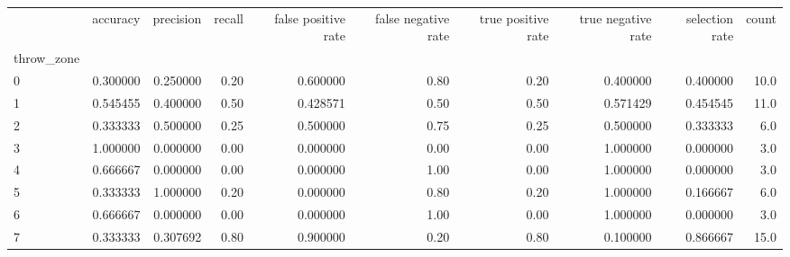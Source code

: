 \begin{tabular}{lrrrrrrrrr}
\toprule
{} &  accuracy &  precision &  recall &  false positive rate &  false negative rate &  true positive rate &  true negative rate &  selection rate &  count \\
throw\_zone &           &            &         &                      &                      &                     &                     &                 &        \\
\midrule
0          &  0.300000 &   0.250000 &    0.20 &             0.600000 &                 0.80 &                0.20 &            0.400000 &        0.400000 &   10.0 \\
1          &  0.545455 &   0.400000 &    0.50 &             0.428571 &                 0.50 &                0.50 &            0.571429 &        0.454545 &   11.0 \\
2          &  0.333333 &   0.500000 &    0.25 &             0.500000 &                 0.75 &                0.25 &            0.500000 &        0.333333 &    6.0 \\
3          &  1.000000 &   0.000000 &    0.00 &             0.000000 &                 0.00 &                0.00 &            1.000000 &        0.000000 &    3.0 \\
4          &  0.666667 &   0.000000 &    0.00 &             0.000000 &                 1.00 &                0.00 &            1.000000 &        0.000000 &    3.0 \\
5          &  0.333333 &   1.000000 &    0.20 &             0.000000 &                 0.80 &                0.20 &            1.000000 &        0.166667 &    6.0 \\
6          &  0.666667 &   0.000000 &    0.00 &             0.000000 &                 1.00 &                0.00 &            1.000000 &        0.000000 &    3.0 \\
7          &  0.333333 &   0.307692 &    0.80 &             0.900000 &                 0.20 &                0.80 &            0.100000 &        0.866667 &   15.0 \\
\bottomrule
\end{tabular}
